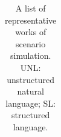 \begin{table}[!htp]
{\begin{tabular}{c|c|c|c|c|c|c|c|c|c|c|c}
    \end{tabular}
}
\caption{A list of representative works of scenario simulation. UNL: unstructured natural language; SL: structured language.}
\label{tab: task_summary}
\end{table}
